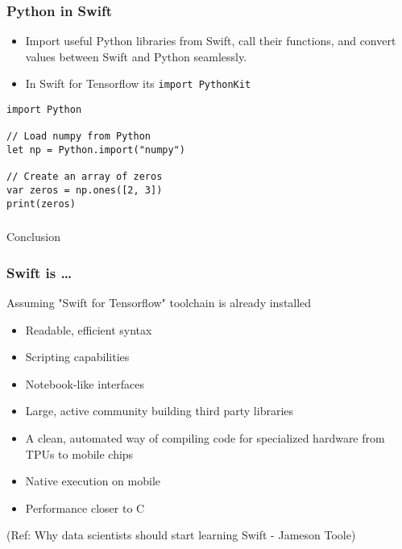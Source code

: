 \begin{frame}[fragile] \frametitle{Python in Swift}

\begin{itemize}
\item Import useful Python libraries from Swift, call their functions, and convert values between Swift and Python seamlessly.
\item In Swift for Tensorflow its \lstinline|import PythonKit|
\end{itemize}

\begin{lstlisting}[basicstyle=\scriptsize]
import Python

// Load numpy from Python
let np = Python.import("numpy")

// Create an array of zeros
var zeros = np.ones([2, 3])
print(zeros)
\end{lstlisting}
\end{frame}

\begin{frame}[fragile]\frametitle{}
\begin{center}
{\Large Conclusion}
\end{center}
\end{frame}

\begin{frame} \frametitle{Swift is \ldots}

Assuming "Swift for Tensorflow" toolchain is already installed

\begin{itemize}
\item Readable, efficient syntax
\item Scripting capabilities
\item Notebook-like interfaces
\item Large, active community building third party libraries
\item A clean, automated way of compiling code for specialized hardware from TPUs to mobile chips
\item Native execution on mobile
\item Performance closer to C
\end{itemize}

{\tiny (Ref: Why data scientists should start learning Swift - Jameson Toole)}
 
\end{frame}

